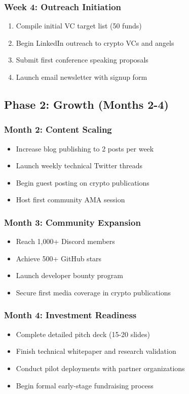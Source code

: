 \documentclass[12pt,a4paper]{article}
\begin{document}
\begin{itemize}
\subsubsection{Week 4: Outreach Initiation}
\begin{enumerate}
    \item Compile initial VC target list (50 funds)
    \item Begin LinkedIn outreach to crypto VCs and angels
    \item Submit first conference speaking proposals
    \item Launch email newsletter with signup form
\end{enumerate}

\subsection{Phase 2: Growth (Months 2-4)}

\subsubsection{Month 2: Content Scaling}
\begin{itemize}
    \item Increase blog publishing to 2 posts per week
    \item Launch weekly technical Twitter threads
    \item Begin guest posting on crypto publications
    \item Host first community AMA session
\end{itemize}

\subsubsection{Month 3: Community Expansion}
\begin{itemize}
    \item Reach 1,000+ Discord members
    \item Achieve 500+ GitHub stars
    \item Launch developer bounty program
    \item Secure first media coverage in crypto publications
\end{itemize}

\subsubsection{Month 4: Investment Readiness}
\begin{itemize}
    \item Complete detailed pitch deck (15-20 slides)
    \item Finish technical whitepaper and research validation
    \item Conduct pilot deployments with partner organizations
    \item Begin formal early-stage fundraising process
\end{itemize}


\end{itemize}
\end{document}
